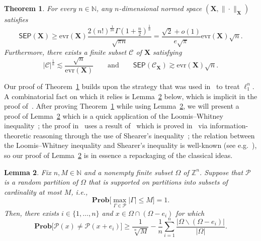 \documentclass[11pt,reqno]{amsart}
\renewcommand{\le}{\leqslant}
\renewcommand{\ge}{\geqslant}
\renewcommand{\setminus}{\smallsetminus}
\newcommand{\evr}{\mathrm{evr}}
\newcommand{\n}{\{1,\ldots,n\}}
\newcommand{\X}{\mathbf X}
\newtheorem{theorem}{Theorem}
\newtheorem{lemma}[theorem]{Lemma}
\theoremstyle{remark}
\newcommand{\N}{\mathbb N}
\newcommand{\Z}{\mathbb Z}
\renewcommand{\Pr}{\mathbf{Prob}}
\newcommand{\sub}{\mathscr{C}}
\renewcommand{\1}{\mathbf 1}
\newcommand{\Part}{\mathscr{P}}
\newcommand{\sep}{\mathsf{SEP}}
\begin{document}
\begin{theorem}\label{thm:sep lower with cardinality size} For every $n\in \N$, any  $n$-dimensional normed space $(\X,\|\cdot\|_\X)$ satisfies
\begin{equation}\label{eq:sep lower evr}
\sep(\X)\ge \evr(\X) \frac{2(n!)^{\frac{1}{2n}}\Gamma\left(1+\frac{n}{2}\right)^{\frac{1}{n}}}{\sqrt{\pi n }}=\frac{\sqrt{2}+o(1)}{e\sqrt{\pi}} \evr(\X)\sqrt{n}.
\end{equation}
Furthermore, there exists a finite subset  $\sub$ of $\X$ satisfying
\begin{equation}\label{eq:sep lower dim reduction}
|\sub|^{\frac{1}{n}}\lesssim \frac{\sqrt{n}}{\evr(\X)} \qquad\mathrm{and}\qquad \sep(\sub_\X)\gtrsim \evr(\X)\sqrt{n}.
\end{equation}
\end{theorem}

Our proof of Theorem~\ref{thm:sep lower with cardinality size} builds upon the strategy that was used in~\cite{CCGGP98} to treat $\ell_1^n$. A  combinatorial fact on which it relies is Lemma~\ref{lem:random partition combinatoirial} below,  which is implicit in the {proof of}~\cite[Lemma~3.1]{CCGGP98}.  After proving Theorem~\ref{thm:sep lower with cardinality size} while using Lemma~\ref{lem:random partition combinatoirial}, we will present a proof of Lemma~\ref{lem:random partition combinatoirial} which is a quick application of the Loomis--Whitney inequality~\cite{LW49};  the proof in~\cite{CCGGP98} uses a result of~\cite{AKPW91} which is proved in~\cite{AKPW91} via information-theoretic reasoning through the use of Shearer's inequality~\cite{CGFS86}; the relation between the Loomis--Whitney inequality and Shearer's inequality is well-known (see e.g.~\cite{BB12}), so our proof of  Lemma~\ref{lem:random partition combinatoirial} is in essence a repackaging of the classical ideas.


\begin{lemma}\label{lem:random partition combinatoirial} Fix $n,M\in \N$ and a nonempty finite subset $\Omega$ of $\Z^n$. Suppose that $\Part$ is a random partition of $\Omega$ that is supported on partitions into subsets of cardinality at most $M$, i.e.,
$$\Pr\Big[\max_{\Gamma\in \Part}|\Gamma|\le M\Big]=1.$$
Then, there exists $i\in \n$ and $x\in \Omega\cap (\Omega-e_i)$ for which
\begin{equation}\label{eq:combinatorial separation}
\Pr \big[\Part(x)\neq \Part(x+e_i)\big]\ge \frac{1}{\sqrt[n]{M}}-\frac{1}{n}\sum_{i=1}^n\frac{|\Omega\setminus(\Omega-e_i)|}{|\Omega|}.
\end{equation}
\end{lemma}
\end{document}
